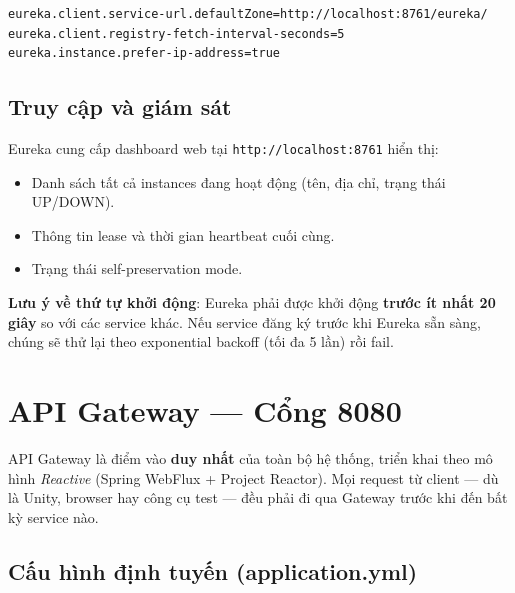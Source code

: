 \documentclass[12pt,a4paper]{report}
\begin{document}
\begin{lstlisting}[style=javaStyle, caption={Cấu hình Eureka Client (áp dụng cho tất cả service)}, label={lst:eurekaclient}]
eureka.client.service-url.defaultZone=http://localhost:8761/eureka/
eureka.client.registry-fetch-interval-seconds=5
eureka.instance.prefer-ip-address=true
\end{lstlisting}

\subsection{Truy cập và giám sát}

Eureka cung cấp dashboard web tại \texttt{http://localhost:8761} hiển thị:
\begin{itemize}
  \item Danh sách tất cả instances đang hoạt động (tên, địa chỉ, trạng thái UP/DOWN).
  \item Thông tin lease và thời gian heartbeat cuối cùng.
  \item Trạng thái self-preservation mode.
\end{itemize}

\textbf{Lưu ý về thứ tự khởi động}: Eureka phải được khởi động \textbf{trước ít nhất 20 giây} so với các service khác. Nếu service đăng ký trước khi Eureka sẵn sàng, chúng sẽ thử lại theo exponential backoff (tối đa 5 lần) rồi fail.

\section{API Gateway --- Cổng 8080}

API Gateway là điểm vào \textbf{duy nhất} của toàn bộ hệ thống, triển khai theo mô hình \textit{Reactive} (Spring WebFlux + Project Reactor). Mọi request từ client --- dù là Unity, browser hay công cụ test --- đều phải đi qua Gateway trước khi đến bất kỳ service nào.

\subsection{Cấu hình định tuyến (application.yml)}
\end{document}
